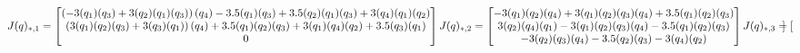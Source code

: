 \documentclass[11pt]{report}
\let\cos\relax
\let\sin\relax
\newcommand{\sin}[1]{\mathit{S}_{#1}}
\newcommand{\cos}[1]{\mathit{C}_{#1}}
\begin{document}
\begin{equation*}
    
J(q)_{*,1} = 
\begin{bmatrix}
           \left(- 3 \sin{\left(q_{1} \right)} \sin{\left(q_{3} \right)} + 3 \sin{\left(q_{2} \right)} \cos{\left(q_{1} \right)} \cos{\left(q_{3} \right)}\right) \cos{\left(q_{4} \right)} - 3.5 \sin{\left(q_{1} \right)} \sin{\left(q_{3} \right)} + 3.5 \sin{\left(q_{2} \right)} \cos{\left(q_{1} \right)} \cos{\left(q_{3} \right)} + 3 \sin{\left(q_{4} \right)} \cos{\left(q_{1} \right)} \cos{\left(q_{2} \right)} \\
           
           \left(3 \sin{\left(q_{1} \right)} \sin{\left(q_{2} \right)} \cos{\left(q_{3} \right)} + 3 \sin{\left(q_{3} \right)} \cos{\left(q_{1} \right)}\right) \cos{\left(q_{4} \right)} + 3.5 \sin{\left(q_{1} \right)} \sin{\left(q_{2} \right)} \cos{\left(q_{3} \right)} + 3 \sin{\left(q_{1} \right)} \sin{\left(q_{4} \right)} \cos{\left(q_{2} \right)} + 3.5 \sin{\left(q_{3} \right)} \cos{\left(q_{1} \right)} \\
           
           0
\end{bmatrix} \\ \\

J(q)_{*,2} = 
\begin{bmatrix}
           - 3 \sin{\left(q_{1} \right)} \sin{\left(q_{2} \right)} \sin{\left(q_{4} \right)} + 3 \sin{\left(q_{1} \right)} \cos{\left(q_{2} \right)} \cos{\left(q_{3} \right)} \cos{\left(q_{4} \right)} + 3.5 \sin{\left(q_{1} \right)} \cos{\left(q_{2} \right)} \cos{\left(q_{3} \right)}
           \\
           3 \sin{\left(q_{2} \right)} \sin{\left(q_{4} \right)} \cos{\left(q_{1} \right)} - 3 \cos{\left(q_{1} \right)} \cos{\left(q_{2} \right)} \cos{\left(q_{3} \right)} \cos{\left(q_{4} \right)} - 3.5 \cos{\left(q_{1} \right)} \cos{\left(q_{2} \right)} \cos{\left(q_{3} \right)}
           \\
           - 3 \sin{\left(q_{2} \right)} \cos{\left(q_{3} \right)} \cos{\left(q_{4} \right)} - 3.5 \sin{\left(q_{2} \right)} \cos{\left(q_{3} \right)} - 3 \sin{\left(q_{4} \right)} \cos{\left(q_{2} \right)}
           
\end{bmatrix} \\ \\


J(q)_{*,3} = 
\begin{bmatrix}


\end{bmatrix}
\end{equation*}
\end{document}
